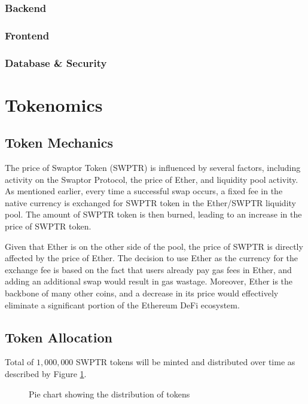 \documentclass[12pt]{article}
\begin{document}
  \subsubsection{Backend}

  \subsubsection{Frontend}

  \subsubsection{Database \& Security}

  \section{Tokenomics}

  \subsection{Token Mechanics}

  The price of Swaptor Token (SWPTR) is influenced by several factors,
  including activity on the Swaptor Protocol, the price of Ether,
  and liquidity pool activity. As mentioned earlier, every time a
  successful swap occurs, a fixed fee in the native currency is
  exchanged for SWPTR token in the Ether/SWPTR liquidity pool.
  The amount of SWPTR token is then burned, leading to an increase
  in the price of SWPTR token.

  Given that Ether is on the other side of the pool, the price of
  SWPTR is directly affected by the price of Ether. The decision to
  use Ether as the currency for the exchange fee is based on the fact
  that users already pay gas fees in Ether, and adding an additional
  swap would result in gas wastage. Moreover, Ether is the backbone of
  many other coins, and a decrease in its price would effectively
  eliminate a significant portion of the Ethereum DeFi ecosystem.




  \subsection{Token Allocation}

  Total of $1,000,000$ SWPTR tokens will be minted and distributed over time as described by Figure \ref{fig:pie-chart}.

\begin{figure}[h]
  \centering
  \caption{Pie chart showing the distribution of tokens}
  \label{fig:pie-chart}
\end{figure}
\end{document}
